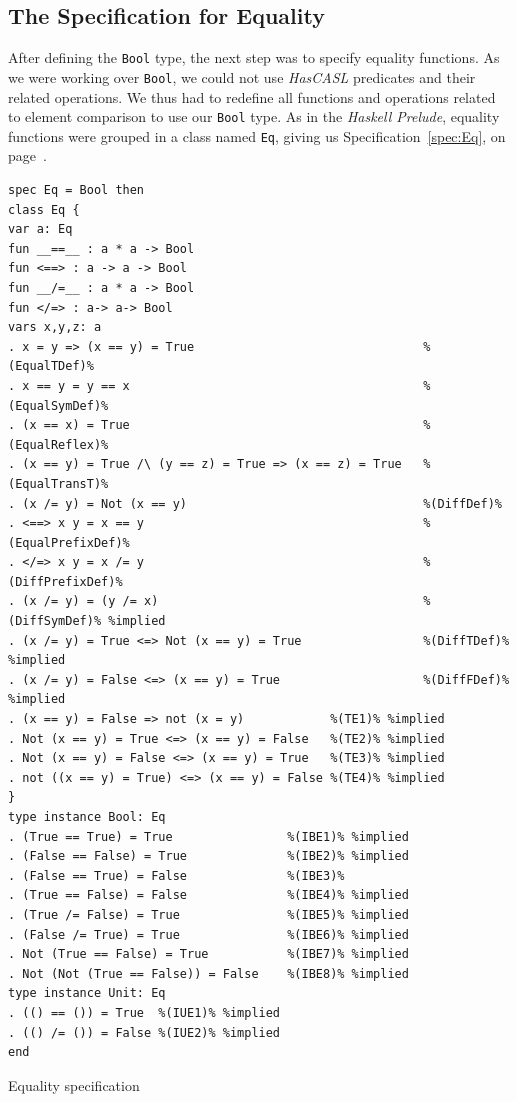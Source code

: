 \documentclass[12pt,twoside]{article}
\numberwithin{spec}{subsection}
\numberwithin{proof}{subsection}
\numberwithin{figure}{subsection}
\numberwithin{code}{subsection}
\newcommand{\citeSpec}[1]{Specification~\ref{#1}, on page~\pageref{#1}}
\begin{document}
\subsection{The Specification for Equality}
After defining the \verb.Bool. type, the next step was to specify equality functions. As we were working over \verb.Bool., we could not use \textit{HasCASL} predicates and their related operations. We thus had to redefine all functions and operations related to element comparison to use our \verb.Bool. type. As in the \textit{Haskell Prelude}, equality functions were grouped in a class named \verb.Eq., giving us \citeSpec{spec:Eq}.

\begin{spec}\capstart
\begin{verbatim}
spec Eq = Bool then
class Eq {
var a: Eq
fun __==__ : a * a -> Bool
fun <==> : a -> a -> Bool
fun __/=__ : a * a -> Bool
fun </=> : a-> a-> Bool
vars x,y,z: a
. x = y => (x == y) = True                                %(EqualTDef)%
. x == y = y == x                                         %(EqualSymDef)%
. (x == x) = True                                         %(EqualReflex)%
. (x == y) = True /\ (y == z) = True => (x == z) = True   %(EqualTransT)%
. (x /= y) = Not (x == y)                                 %(DiffDef)%
. <==> x y = x == y                                       %(EqualPrefixDef)%
. </=> x y = x /= y                                       %(DiffPrefixDef)%
. (x /= y) = (y /= x)                                     %(DiffSymDef)% %implied
. (x /= y) = True <=> Not (x == y) = True                 %(DiffTDef)% %implied
. (x /= y) = False <=> (x == y) = True                    %(DiffFDef)% %implied
. (x == y) = False => not (x = y)            %(TE1)% %implied
. Not (x == y) = True <=> (x == y) = False   %(TE2)% %implied
. Not (x == y) = False <=> (x == y) = True   %(TE3)% %implied
. not ((x == y) = True) <=> (x == y) = False %(TE4)% %implied
}
type instance Bool: Eq
. (True == True) = True                %(IBE1)% %implied
. (False == False) = True              %(IBE2)% %implied
. (False == True) = False              %(IBE3)%
. (True == False) = False              %(IBE4)% %implied
. (True /= False) = True               %(IBE5)% %implied
. (False /= True) = True               %(IBE6)% %implied
. Not (True == False) = True           %(IBE7)% %implied
. Not (Not (True == False)) = False    %(IBE8)% %implied
type instance Unit: Eq
. (() == ()) = True  %(IUE1)% %implied
. (() /= ()) = False %(IUE2)% %implied
end
\end{verbatim}
\caption{Equality specification}
\label{spec:Eq}
\end{spec}
\end{document}
